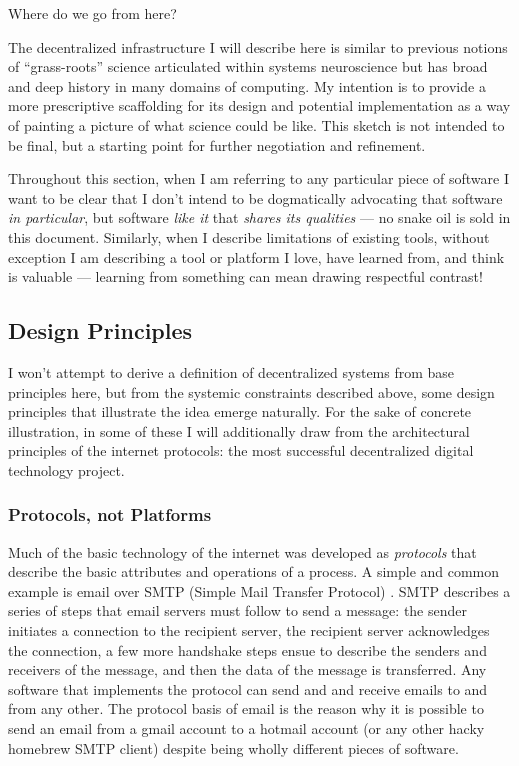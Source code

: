 \documentclass[10pt]{article}
\begin{document}
\begin{multicols}{2}
 Where do we go from here?

The decentralized infrastructure I will describe here is similar to
previous notions of ``grass-roots'' science articulated within systems
neuroscience \cite{mainenBetterWayCrack2016}  but has broad and
deep history in many domains of computing. My intention is to provide a
more prescriptive scaffolding for its design and potential
implementation as a way of painting a picture of what science could be
like. This sketch is not intended to be final, but a starting point for
further negotiation and refinement.

Throughout this section, when I am referring to any particular piece of
software I want to be clear that I don't intend to be dogmatically
advocating that software \emph{in particular}, but software \emph{like
it} that \emph{shares its qualities} --- no snake oil is sold in this
document. Similarly, when I describe limitations of existing tools,
without exception I am describing a tool or platform I love, have
learned from, and think is valuable --- learning from something can mean
drawing respectful contrast!

\hypertarget{design-principles}{%
\subsection{Design Principles}\label{design-principles}}

I won't attempt to derive a definition of decentralized systems from
base principles here, but from the systemic constraints described above,
some design principles that illustrate the idea emerge naturally. For
the sake of concrete illustration, in some of these I will additionally
draw from the architectural principles of the internet protocols: the
most successful decentralized digital technology project.

\hypertarget{protocols-not-platforms}{%
\subsubsection{Protocols, not Platforms}\label{protocols-not-platforms}}

Much of the basic technology of the internet was developed as
\emph{protocols} that describe the basic attributes and operations of a
process. A simple and common example is email over SMTP (Simple Mail
Transfer Protocol)\cite{Rfc5321SimpleMail} . SMTP describes a
series of steps that email servers must follow to send a message: the
sender initiates a connection to the recipient server, the recipient
server acknowledges the connection, a few more handshake steps ensue to
describe the senders and receivers of the message, and then the data of
the message is transferred. Any software that implements the protocol
can send and and receive emails to and from any other. The protocol
basis of email is the reason why it is possible to send an email from a
gmail account to a hotmail account (or any other hacky homebrew SMTP
client) despite being wholly different pieces of software.


\end{multicols}
\end{document}
